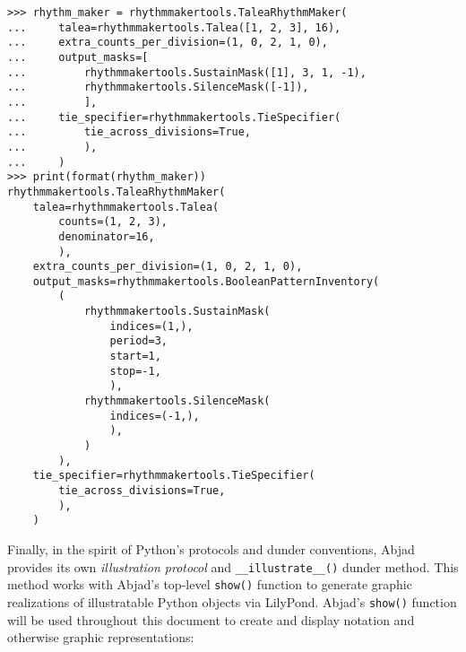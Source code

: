 \begin{comment}
<abjad>
rhythm_maker = rhythmmakertools.TaleaRhythmMaker(
    talea=rhythmmakertools.Talea([1, 2, 3], 16),
    extra_counts_per_division=(1, 0, 2, 1, 0),
    output_masks=[
        rhythmmakertools.SustainMask([1], 3, 1, -1),
        rhythmmakertools.SilenceMask([-1]),
        ],
    tie_specifier=rhythmmakertools.TieSpecifier(
        tie_across_divisions=True,
        ),
    )
print(format(rhythm_maker))
</abjad>
\end{comment}

\begin{abjadbookoutput}
\begin{singlespacing}
\vspace{-0.5\baselineskip}
\begin{lstlisting}
>>> rhythm_maker = rhythmmakertools.TaleaRhythmMaker(
...     talea=rhythmmakertools.Talea([1, 2, 3], 16),
...     extra_counts_per_division=(1, 0, 2, 1, 0),
...     output_masks=[
...         rhythmmakertools.SustainMask([1], 3, 1, -1),
...         rhythmmakertools.SilenceMask([-1]),
...         ],
...     tie_specifier=rhythmmakertools.TieSpecifier(
...         tie_across_divisions=True,
...         ),
...     )
>>> print(format(rhythm_maker))
rhythmmakertools.TaleaRhythmMaker(
    talea=rhythmmakertools.Talea(
        counts=(1, 2, 3),
        denominator=16,
        ),
    extra_counts_per_division=(1, 0, 2, 1, 0),
    output_masks=rhythmmakertools.BooleanPatternInventory(
        (
            rhythmmakertools.SustainMask(
                indices=(1,),
                period=3,
                start=1,
                stop=-1,
                ),
            rhythmmakertools.SilenceMask(
                indices=(-1,),
                ),
            )
        ),
    tie_specifier=rhythmmakertools.TieSpecifier(
        tie_across_divisions=True,
        ),
    )
\end{lstlisting}
\end{singlespacing}
\end{abjadbookoutput}

\noindent Finally, in the spirit of Python's protocols and dunder conventions,
Abjad provides its own \emph{illustration protocol} and
\texttt{\_\_illustrate\_\_()} dunder method. This method works with Abjad's
top-level \texttt{show()} function to generate graphic realizations of
illustratable Python objects via LilyPond. Abjad's \texttt{show()} function
will be used throughout this document to create and display notation and
otherwise graphic representations:

